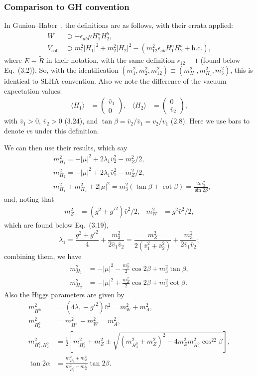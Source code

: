 \documentclass[a4paper,11pt,captions=tableheading,DIV=12]{scrartcl}
\newcommand\w[1]{_{\mathrm{#1}}}
\newcommand\pmat[1]{\begin{pmatrix}#1\end{pmatrix}}
\newcommand{\bE}{\bar E}
\begin{document}
\subsubsection{Comparison to GH convention}
In Gunion--Haber~\cite{GH}, the definitions are as follows, with their errata applied:
\begin{align}
 W &\supset -\epsilon_{ab}\mu H_1^aH_2^b,\tag{GH:3.3--3.4}
\\
V\w{soft}&\supset m_1^2|H_1|^2 + m_2^2 |H_2|^2 - (m_{12}^2\epsilon_{ab}H_1^a H_2^b+\text{h.c.}),
\tag{GH:3.9}
%
\end{align}
where $\bE\equiv\tilde R$ in their notation, with the same definition $\epsilon_{12}=1$ (found below Eq.~(3.2)).
So, with the identification $(m_1^2,m_2^2,m_{12}^2)\equiv(m_{H_1}^2,m_{H_2}^2,m_3^2)$, this is identical to SLHA convention.
Also we note the difference of the vacuum expectation values:
\begin{align}
 \langle H_1\rangle &= \pmat{\bar v_1\\0},&
 \langle H_2\rangle &= \pmat{0\\\bar v_2},
\tag{GH:3.7}
\end{align}
with $\bar v_1>0$, $\bar v_2>0$ (3.24), and $\tan\beta=\bar v_2/\bar v_1=v_2/v_1$ (2.8).
Here we use bars to denote $v$s under this definition.

We can then use their results, which say
\begin{align}
 &m_{H_1}^2 = -|\mu|^2 + 2\lambda_1 \bar v_2^2 - m_Z^2/2,
\tag{GH:3.21c}
\\
 &m_{H_2}^2 = -|\mu|^2 + 2\lambda_1 \bar v_1^2 - m_Z^2/2,
\tag{GH:3.21d}
\\
 &m_{H_1}^2 + m_{H_2}^2 + 2|\mu|^2 
= m_{3}^2(\tan\beta+\cot\beta)
= \frac{2m_{3}^2}{\sin2\beta},
\tag{GH:3.22}
\end{align}
and, noting that
\begin{align}
 m_Z^2&=(g^2+g'^2)\bar v^2/2,&
 m_W^2&=g^2\bar v^2/2,
\end{align}
which are found below Eq.~(3.19),
\begin{equation}
 \lambda_1
= \frac{g^2+g'^2}{4} + \frac{m_3^2}{2\bar v_1\bar v_2}
= \frac{m_Z^2}{2(\bar v_1^2+\bar v_2^2)} + \frac{m_3^2}{2\bar v_1\bar v_2};
\end{equation}
combining them, we have
\begin{align}
 m_{H_1}^2&=-|\mu|^2-\frac{m_Z^2}{2}\cos2\beta + m_3^2\tan\beta,\\
 m_{H_2}^2&=-|\mu|^2+\frac{m_Z^2}{2}\cos2\beta + m_3^2\cot\beta.
\end{align}
Also the Higgs parameters are given by
\begin{align}
 m_{H^\pm}^2&=(4\lambda_1-g'^2)\bar v^2=m_W^2+m_A^2,\tag{GH:3.16}\\
 m_{H_3^0}^2&=m_{H^\pm}^2-m_W^2=m_A^2,\tag{GH:3.17}\\
 m_{H_1^0,H_2^0}^2 &=
 \frac12\left[m_{H_3^0}^2+m_Z^2\pm\sqrt{
 (m_{H_3^0}^2+m_Z^2)^2-4m_Z^2 m_{H_3^0}^2\cos^22\beta
}\right],\tag{GH:3.18}\\
\tan2\alpha&=\frac{m^2_{H_3^0}+m_Z^2}{m_{H_3^0}^2-m_Z^2}\tan2\beta\tag{GH:3.19}.
\end{align}
\end{document}
